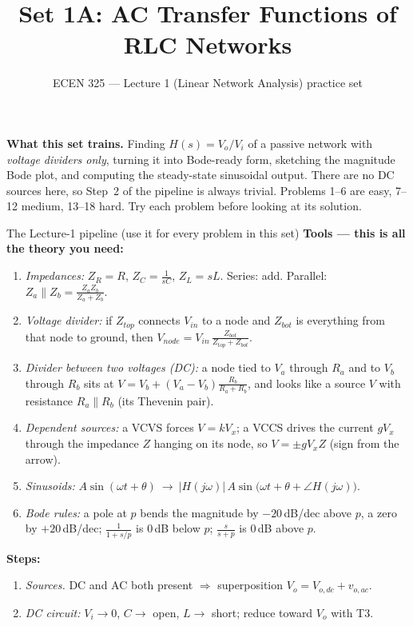 \documentclass[11pt]{article}
\title{Set 1A: AC Transfer Functions of RLC Networks}
\author{ECEN 325 --- Lecture 1 (Linear Network Analysis) practice set}
\date{}
\begin{document}
\maketitle

\textbf{What this set trains.} Finding $H(s)=V_o/V_i$ of a passive network with \emph{voltage dividers only},
turning it into Bode-ready form, sketching the magnitude Bode plot, and computing the steady-state sinusoidal
output. There are no DC sources here, so Step~2 of the pipeline is always trivial. Problems 1--6 are easy,
7--12 medium, 13--18 hard. Try each problem before looking at its solution.


\begin{cardbox}{The Lecture-1 pipeline (use it for every problem in this set)}
\textbf{Tools --- this is all the theory you need:}
\begin{enumerate}[label=\textbf{T\arabic*},leftmargin=2.2em,itemsep=1pt]
\item \emph{Impedances:} $Z_R=R$, $Z_C=\frac{1}{sC}$, $Z_L=sL$. Series: add. Parallel:
      $Z_a\parallel Z_b=\frac{Z_aZ_b}{Z_a+Z_b}$.
\item \emph{Voltage divider:} if $Z_{top}$ connects $V_{in}$ to a node and $Z_{bot}$ is everything from that
      node to ground, then $V_{node}=V_{in}\,\frac{Z_{bot}}{Z_{top}+Z_{bot}}$.
\item \emph{Divider between two voltages (DC):} a node tied to $V_a$ through $R_a$ and to $V_b$ through $R_b$ sits at
      $V=V_b+(V_a-V_b)\frac{R_b}{R_a+R_b}$, and looks like a source $V$ with resistance $R_a\parallel R_b$
      (its Thevenin pair).
\item \emph{Dependent sources:} a VCVS forces $V=kV_x$; a VCCS drives the current $gV_x$ through the impedance $Z$
      hanging on its node, so $V=\pm gV_x Z$ (sign from the arrow).
\item \emph{Sinusoids:} $A\sin(\omega t+\theta)\ \to\ |H(j\omega)|\,A\sin\big(\omega t+\theta+\angle H(j\omega)\big)$.
\item \emph{Bode rules:} a pole at $p$ bends the magnitude by $-20$\,dB/dec above $p$, a zero by $+20$\,dB/dec;
      $\frac{1}{1+s/p}$ is $0$\,dB below $p$; $\frac{s}{s+p}$ is $0$\,dB above $p$.
\end{enumerate}
\textbf{Steps:}
\begin{enumerate}[leftmargin=2.2em,itemsep=1pt]
\item \emph{Sources.} DC and AC both present $\Rightarrow$ superposition $V_o=V_{o,dc}+v_{o,ac}$.
\item \emph{DC circuit:} $V_i\to0$, $C\to$ open, $L\to$ short; reduce toward $V_o$ with T3.

\end{enumerate}
\end{cardbox}
\end{document}
